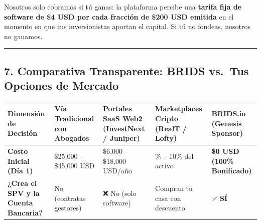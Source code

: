 \documentclass[
]{article}
\newcounter{none} %
\begin{document}
Nosotros solo cobramos si tú ganas: la plataforma percibe una
\textbf{tarifa fija de software de \$4 USD por cada fracción de \$200
USD emitida} en el momento en que tus inversionistas aportan el capital.
Si tú no fondeas, nosotros no ganamos.

\begin{center}\rule{0.5\linewidth}{0.5pt}\end{center}

\subsection{7. Comparativa Transparente: BRIDS vs.~Tus Opciones de
Mercado}\label{comparativa-transparente-brids-vs.-tus-opciones-de-mercado}

{\def\LTcaptype{none} %
\begin{longtable}[]{@{}
  >{\raggedright\arraybackslash}p{}
  >{\centering\arraybackslash}p{}
  >{\centering\arraybackslash}p{}
  >{\centering\arraybackslash}p{}
  >{\centering\arraybackslash}p{}@{}}
\toprule\noalign{}
\begin{minipage}[b]{\linewidth}\raggedright
Dimensión de Decisión
\end{minipage} & \begin{minipage}[b]{\linewidth}\centering
Vía Tradicional con Abogados
\end{minipage} & \begin{minipage}[b]{\linewidth}\centering
Portales SaaS Web2 (InvestNext / Juniper)
\end{minipage} & \begin{minipage}[b]{\linewidth}\centering
Marketplaces Cripto (RealT / Lofty)
\end{minipage} & \begin{minipage}[b]{\linewidth}\centering
\textbf{BRIDS.io (Genesis Sponsor)}
\end{minipage} \\
\midrule\noalign{}
\endhead
\bottomrule\noalign{}
\endlastfoot
\textbf{Costo Inicial (Día 1)} & \$25,000 -- \$45,000 USD & \$6,000 --
\$18,000 USD/año & 5\% -- 10\% del activo & \textbf{\$0 USD (100\%
Bonificado)} \\
\textbf{¿Crea el SPV y la Cuenta Bancaria?} & No (contratas gestores) &
❌ No (solo software) & Compran tu casa con descuento & ✅ \textbf{SÍ
}
\end{longtable}}
\end{document}
